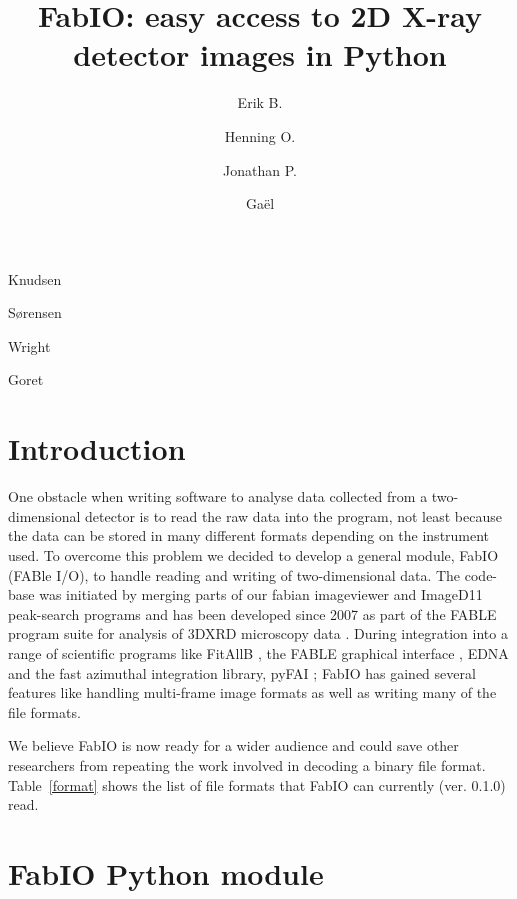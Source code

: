 \documentclass[preprint ]{iucr}
\begin{document}
\title{FabIO: easy access to 2D X-ray detector images in Python}

    \author[a]{Erik B.}{Knudsen}
    \author[b]{Henning O.}{S{\o}rensen}
    \author[c]{Jonathan P.}{Wright}
    \author[c]{Ga\"el}{Goret}

\maketitle

\section{Introduction}

One obstacle when writing software to analyse data collected from a
two-dimensional detector is to read the raw data into the program,
not least because the data can be stored in many different formats
depending on the instrument used.
To overcome this problem we decided to develop a general module,
FabIO (FABle I/O), to handle reading and writing of two-dimensional
data.
The code-base was initiated by merging parts of our fabian imageviewer
\cite{fabian} and ImageD11 \cite{ImageD11} peak-search programs and has
been developed since 2007 as part of the FABLE \cite{fable} program suite
for analysis of 3DXRD microscopy data \cite{3dxrd}.
During integration into a range of scientific programs like FitAllB
\cite{fitallb}, the FABLE graphical interface \cite{fable}, EDNA \cite{edna} and
the fast azimuthal integration library, pyFAI \cite{pyfai}; FabIO has gained
several features like handling multi-frame image formats as well as
writing many of the file formats.

We believe FabIO is now ready for a wider audience and could save other
researchers from repeating the work involved in decoding a
binary file format. Table~\ref{format} shows the list of file formats that
FabIO can currently (ver. 0.1.0) read.


\section{FabIO Python module}
\end{document}
